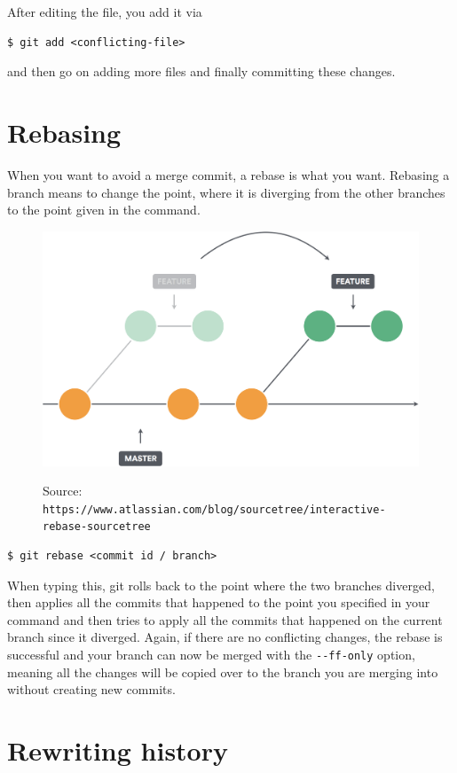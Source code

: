 \documentclass[a4paper, 12pt]{article}
\begin{document}
	After editing the file, you add it via
	
	\begin{lstlisting}
$ git add <conflicting-file>
	\end{lstlisting}
	
	and then go on adding more files and finally committing these changes.
		
	\section{Rebasing}
		When you want to avoid a merge commit, a rebase is what you want. Rebasing a branch means to change the point, where it is diverging from the other branches to the point given in the command.
		
		\begin{figure}[h]
			\centering
			\includegraphics[width=.725\linewidth]{images/gitrebase.png}
			\label{fig1}
			\caption{Source: \newline\lstinline|https://www.atlassian.com/blog/sourcetree/interactive-rebase-sourcetree|}
		\end{figure}
		
		\begin{lstlisting}
$ git rebase <commit id / branch>
		\end{lstlisting}
		
		When typing this, git rolls back to the point where the two branches diverged, then applies all the commits that happened to the point you specified in your command and then tries to apply all the commits that happened on the current branch since it diverged. Again, if there are no conflicting changes, the rebase is successful and your branch can now be merged with the \lstinline|--ff-only| option, meaning all the changes will be copied over to the branch you are merging into without creating new commits.
		
	\section {Rewriting history}
	
\end{document}
